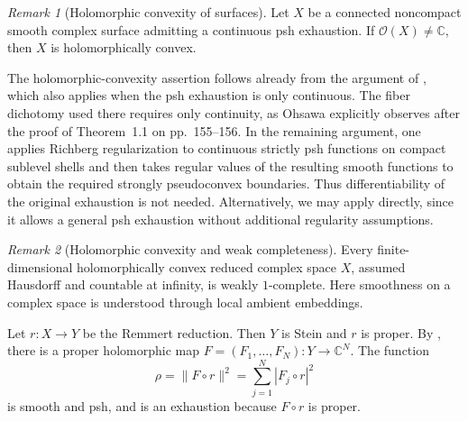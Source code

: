 \documentclass[11pt]{amsart}
\theoremstyle{definition}
\theoremstyle{remark}
\newtheorem{remark}{Remark}[section]
\numberwithin{equation}{section}
\newcommand{\C}{\mathbb C}
\newcommand{\OO}{\mathcal O}
\begin{document}
\begin{remark}[Holomorphic convexity of surfaces]
\label{prop:surface-nonconstant-function}
Let $X$ be a connected noncompact smooth complex surface
admitting a continuous psh exhaustion. If $\OO(X)\ne\C$,
then $X$ is holomorphically convex.

The holomorphic-convexity assertion follows already from
the argument of \cite[Proposition~1.4, p.~156]{Ohsawa1981},
which also applies when the psh exhaustion is only continuous.
The fiber dichotomy used there requires only continuity,
as Ohsawa explicitly observes after the proof of Theorem~1.1
on pp.~155--156. In the remaining argument, one applies
Richberg regularization to continuous strictly psh functions
on compact sublevel shells and then takes regular values
of the resulting smooth functions to obtain the required
strongly pseudoconvex boundaries. Thus differentiability
of the original exhaustion is not needed.
Alternatively, we may apply \cite[Theorem~1.1]{Vajaitu2022}
directly, since it allows a general psh exhaustion without
additional regularity assumptions.
\end{remark}

\begin{remark}[Holomorphic convexity and weak completeness]
\label{rem:holomorphic-convexity-weak-completeness}
Every finite-dimensional holomorphically convex reduced complex
space $X$, assumed Hausdorff and countable at infinity, is weakly
$1$-complete.
Here smoothness on a complex space is understood through local
ambient embeddings.

Let $r:X\to Y$ be the Remmert reduction. Then $Y$ is Stein
and $r$ is proper. By \cite[Theorem~5]{Narasimhan1960}, there
is a proper holomorphic map $F=(F_1,\ldots,F_N):Y\to\C^N$.
The function
\[
  \rho=\|F\circ r\|^2=\sum_{j=1}^N|F_j\circ r|^2
\]
is smooth and psh, and is an exhaustion because $F\circ r$
is proper.
\end{remark}
\end{document}
